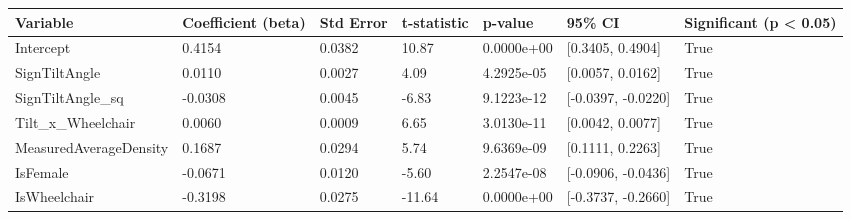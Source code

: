 \begin{tabular}{lllllll}
\hline
Variable & Coefficient (beta) & Std Error & t-statistic & p-value & 95\% CI & Significant (p < 0.05) \\ \hline
Intercept & 0.4154 & 0.0382 & 10.87 & 0.0000e+00 & [0.3405, 0.4904] & True \\
SignTiltAngle & 0.0110 & 0.0027 & 4.09 & 4.2925e-05 & [0.0057, 0.0162] & True \\
SignTiltAngle\_sq & -0.0308 & 0.0045 & -6.83 & 9.1223e-12 & [-0.0397, -0.0220] & True \\
Tilt\_x\_Wheelchair & 0.0060 & 0.0009 & 6.65 & 3.0130e-11 & [0.0042, 0.0077] & True \\
MeasuredAverageDensity & 0.1687 & 0.0294 & 5.74 & 9.6369e-09 & [0.1111, 0.2263] & True \\
IsFemale & -0.0671 & 0.0120 & -5.60 & 2.2547e-08 & [-0.0906, -0.0436] & True \\
IsWheelchair & -0.3198 & 0.0275 & -11.64 & 0.0000e+00 & [-0.3737, -0.2660] & True \\
\hline
\end{tabular}
